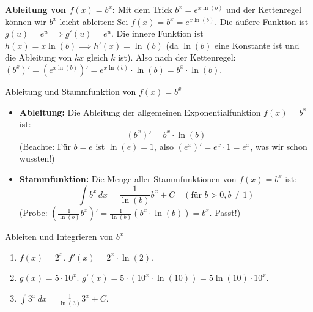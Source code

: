 \textbf{Ableitung von $f(x) = b^x$:}
Mit dem Trick $b^x = e^{x \ln(b)}$ und der Kettenregel können wir $b^x$ leicht ableiten:
Sei $f(x) = b^x = e^{x \ln(b)}$.
Die äußere Funktion ist $g(u)=e^u \implies g'(u)=e^u$.
Die innere Funktion ist $h(x)=x \ln(b) \implies h'(x)=\ln(b)$ (da $\ln(b)$ eine Konstante ist und die Ableitung von $kx$ gleich $k$ ist).
Also nach der Kettenregel:
$(b^x)' = (e^{x \ln(b)})' = e^{x \ln(b)} \cdot \ln(b) = b^x \cdot \ln(b)$.

\begin{merksatzumgebung}{Ableitung und Stammfunktion von $f(x)=b^x$}
\begin{itemize}
    \item \textbf{Ableitung:} Die Ableitung der allgemeinen Exponentialfunktion $f(x)=b^x$ ist:
    \[ (b^x)' = b^x \cdot \ln(b) \]
    (Beachte: Für $b=e$ ist $\ln(e)=1$, also $(e^x)' = e^x \cdot 1 = e^x$, was wir schon wussten!)
    \item \textbf{Stammfunktion:} Die Menge aller Stammfunktionen von $f(x)=b^x$ ist:
    \[ \int b^x \,dx = \frac{1}{\ln(b)} b^x + C \quad (\text{für } b>0, b\neq 1) \]
    (Probe: $(\frac{1}{\ln(b)} b^x)' = \frac{1}{\ln(b)} (b^x \cdot \ln(b)) = b^x$. Passt!)
\end{itemize}
\end{merksatzumgebung}

\begin{beispielumgebung}{Ableiten und Integrieren von $b^x$}
\begin{enumerate}
    \item $f(x) = 2^x$.
        $f'(x) = 2^x \cdot \ln(2)$.
    \item $g(x) = 5 \cdot 10^x$.
        $g'(x) = 5 \cdot (10^x \cdot \ln(10)) = 5 \ln(10) \cdot 10^x$.
    \item $\int 3^x \,dx = \frac{1}{\ln(3)} 3^x + C$.
\end{enumerate}
\end{beispielumgebung}

